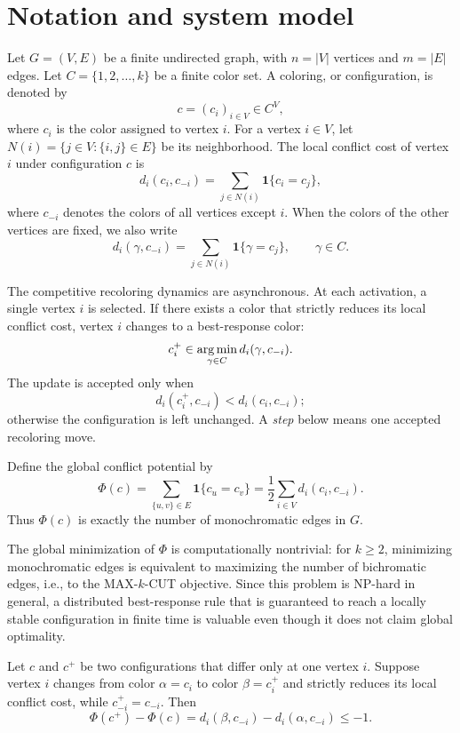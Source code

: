 \section{Notation and system model}

Let $G=(V,E)$ be a finite undirected graph, with $n=|V|$ vertices and
$m=|E|$ edges. Let $C=\{1,2,\ldots,k\}$ be a finite color set. A coloring, or
configuration, is denoted by
\[
    c=(c_i)_{i\in V}\in C^V,
\]
where $c_i$ is the color assigned to vertex $i$. For a vertex $i\in V$, let
$N(i)=\{j\in V:\{i,j\}\in E\}$ be its neighborhood. The local conflict cost of
vertex $i$ under configuration $c$ is
\[
    d_i(c_i,c_{-i})
    =
    \sum_{j\in N(i)} \mathbf{1}\{c_i=c_j\},
\]
where $c_{-i}$ denotes the colors of all vertices except $i$. When the colors
of the other vertices are fixed, we also write
\[
    d_i(\gamma,c_{-i})
    =
    \sum_{j\in N(i)} \mathbf{1}\{\gamma=c_j\},
    \qquad \gamma\in C .
\]

The competitive recoloring dynamics are asynchronous. At each activation, a
single vertex $i$ is selected. If there exists a color that strictly reduces
its local conflict cost, vertex $i$ changes to a best-response color:
\[
    c_i^+
    \in
    \operatorname*{arg\,min}_{\gamma\in C} d_i(\gamma,c_{-i}).
\]
The update is accepted only when
\[
    d_i(c_i^+,c_{-i}) < d_i(c_i,c_{-i});
\]
otherwise the configuration is left unchanged. A \emph{step} below means one
accepted recoloring move.

Define the global conflict potential by
\[
    \Phi(c)
    =
    \sum_{\{u,v\}\in E} \mathbf{1}\{c_u=c_v\}
    =
    \frac12 \sum_{i\in V} d_i(c_i,c_{-i}).
\]
Thus $\Phi(c)$ is exactly the number of monochromatic edges in $G$.

The global minimization of $\Phi$ is computationally nontrivial: for
$k\ge 2$, minimizing monochromatic edges is equivalent to maximizing the
number of bichromatic edges, i.e., to the MAX-$k$-CUT objective. Since this
problem is NP-hard in general, a distributed best-response rule that is
guaranteed to reach a locally stable configuration in finite time is valuable
even though it does not claim global optimality.

\begin{lemma}
Let $c$ and $c^+$ be two configurations that differ only at one vertex $i$.
Suppose vertex $i$ changes from color $\alpha=c_i$ to color $\beta=c_i^+$ and
strictly reduces its local conflict cost, while $c_{-i}^+=c_{-i}$. Then
\[
    \Phi(c^+)-\Phi(c)
    =
    d_i(\beta,c_{-i})-d_i(\alpha,c_{-i})
    \le -1 .
\]
\end{lemma}

